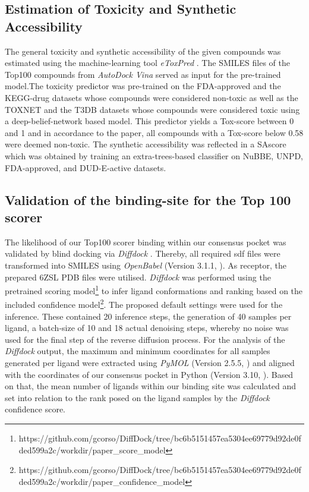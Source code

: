 \documentclass[11pt, letterpaper, titlepage]{article}
\renewcommand{\cite}{\parencite}
\begin{document}
\subsection{Estimation of Toxicity and Synthetic Accessibility}
The general toxicity and synthetic accessibility of the given compounds was estimated using the machine-learning tool \textit{eToxPred} \cite{pu2019toxpred}. The SMILES files of the Top100 compounds from \textit{AutoDock Vina} \cite{Trott.2010} served as input for the pre-trained model.The toxicity predictor was pre-trained on the FDA-approved and the KEGG-drug datasets whose compounds were considered non-toxic as well as the TOXNET and the T3DB datasets whose compounds were considered toxic using a deep-belief-network based model. This predictor yields a Tox-score between 0 and 1 and in accordance to the paper, all compounds with a Tox-score below 0.58 were deemed non-toxic. The synthetic accessibility was reflected in a \ac{SAscore} which was obtained by training an extra-trees-based classifier on NuBBE, UNPD, FDA-approved, and DUD-E-active datasets.
 
\subsection{Validation of the binding-site for the Top 100 scorer}
The likelihood of our Top100 scorer binding within our consensus pocket was validated by blind docking via \textit{Diffdock} \cite{Corso.2022}. Thereby, all required sdf files were transformed into SMILES using \textit{OpenBabel} (Version 3.1.1, \textcite{OpenBabel}). As receptor, the prepared 6ZSL PDB files were utilised. \textit{Diffdock} was performed using the pretrained scoring model\footnote{https://github.com/gcorso/DiffDock/tree/bc6b5151457ea5304ee69779d92de0fded599a2c/workdir/paper\_score\_model} to infer ligand conformations and ranking based on the included confidence model\footnote{https://github.com/gcorso/DiffDock/tree/bc6b5151457ea5304ee69779d92de0fded599a2c/workdir/paper\_confidence\_model}. The proposed default settings were used for the inference. These contained 20 inference steps, the generation of 40 samples per ligand, a batch-size of 10 and 18 actual denoising steps, whereby no noise was used for the final step of the reverse diffusion process. For the analysis of the \textit{Diffdock} output, the maximum and minimum coordinates for all samples generated per ligand were extracted using \textit{PyMOL} (Version 2.5.5, \textcite{PyMOL}) and aligned with the coordinates of our consensus pocket in Python (Version 3.10, \textcite{Python}). Based on that, the mean number of ligands within our binding site was calculated and set into relation to the rank posed on the ligand samples by the \textit{Diffdock} confidence score.
\end{document}
